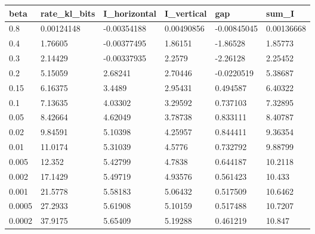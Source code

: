 \begin{tabular}{llllll}
\toprule
beta & rate\_kl\_bits & I\_horizontal & I\_vertical & gap & sum\_I \\
\midrule
0.8 & 0.00124148 & -0.00354188 & 0.00490856 & -0.00845045 & 0.00136668 \\
0.4 & 1.76605 & -0.00377495 & 1.86151 & -1.86528 & 1.85773 \\
0.3 & 2.14429 & -0.00337935 & 2.2579 & -2.26128 & 2.25452 \\
0.2 & 5.15059 & 2.68241 & 2.70446 & -0.0220519 & 5.38687 \\
0.15 & 6.16375 & 3.4489 & 2.95431 & 0.494587 & 6.40322 \\
0.1 & 7.13635 & 4.03302 & 3.29592 & 0.737103 & 7.32895 \\
0.05 & 8.42664 & 4.62049 & 3.78738 & 0.833111 & 8.40787 \\
0.02 & 9.84591 & 5.10398 & 4.25957 & 0.844411 & 9.36354 \\
0.01 & 11.0174 & 5.31039 & 4.5776 & 0.732792 & 9.88799 \\
0.005 & 12.352 & 5.42799 & 4.7838 & 0.644187 & 10.2118 \\
0.002 & 17.1429 & 5.49719 & 4.93576 & 0.561423 & 10.433 \\
0.001 & 21.5778 & 5.58183 & 5.06432 & 0.517509 & 10.6462 \\
0.0005 & 27.2933 & 5.61908 & 5.10159 & 0.517488 & 10.7207 \\
0.0002 & 37.9175 & 5.65409 & 5.19288 & 0.461219 & 10.847 \\
\bottomrule
\end{tabular}
